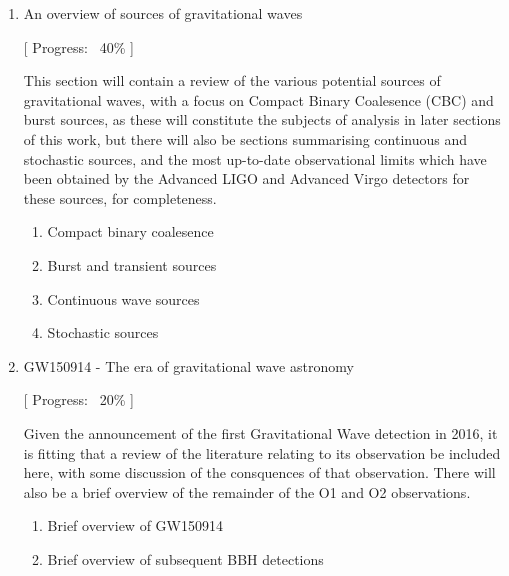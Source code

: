 \documentclass[openleft]{kentigern}
\theoremstyle{definition}
\begin{document}
\begin{enumerate}
\begin{enumerate}
   [ Progress: ~40\% ]
   
   This section will contain a short historical overview of detector
   technology, and a review of the technological challenges and noise
   sources which modern detectors face, as a motivation for the
   requirement for advanced data analysis techniques, and noise
   modelling. If work on Gaussian process regression for modelling
   Newtonian noise is sufficiently advanced this would call for an
   expanded section on Newtonian noise specifically.

   \begin{enumerate}
   \item A brief history of GW detectors
   \item Noise sources and their mitigation
   \item Current-generation detectors
   \item Future detectors
   \end{enumerate}

   
\item An overview of sources of gravitational waves

  [ Progress: ~40\% ]
  
   This section will contain a review of the various potential sources
   of gravitational waves, with a focus on Compact Binary Coalesence
   (CBC) and burst sources, as these will constitute the subjects of
   analysis in later sections of this work, but there will also be
   sections summarising continuous and stochastic sources, and the
   most up-to-date observational limits which have been obtained by
   the Advanced LIGO and Advanced Virgo detectors for these sources,
   for completeness.
   \begin{enumerate}
   \item Compact binary coalesence
   \item Burst and transient sources
   \item Continuous wave sources
   \item Stochastic sources
   \end{enumerate}

   
 \item GW150914 - The era of gravitational wave astronomy
   
  [ Progress: ~20\% ]
  
   Given the announcement of the first Gravitational Wave detection in
   2016, it is fitting that a review of the literature relating to its
   observation be included here, with some discussion of the
   consquences of that observation. There will also be a brief
   overview of the remainder of the O1 and O2 observations.
   \begin{enumerate}
   \item Brief overview of GW150914
   \item Brief overview of subsequent BBH detections
   \end{enumerate}


\end{enumerate}
\end{enumerate}
\end{document}
